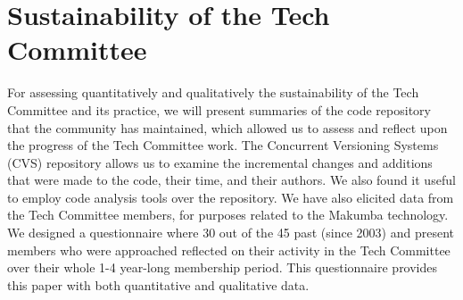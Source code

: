 \documentclass{llncs}
\begin{document}


\section{Sustainability of the Tech Committee}\label{sec:techCommittee}

For assessing quantitatively and qualitatively the sustainability of the Tech Committee and its practice, we will present summaries of the code repository that the community has maintained, which allowed us to assess and reflect upon the progress of the Tech Committee work. The Concurrent Versioning Systems (CVS) repository allows us to examine the incremental changes and additions that were made to the code, their time, and their authors. We also found it useful to employ code analysis tools over the repository. We have also elicited data from the Tech Committee members, for purposes related to the Makumba technology. 
We designed a questionnaire where 30 out of the 45 past (since 2003) and present members who were approached reflected on their activity in the Tech Committee over their whole 1-4 year-long membership period. This questionnaire provides this paper with both quantitative and qualitative data. 

\end{document}
